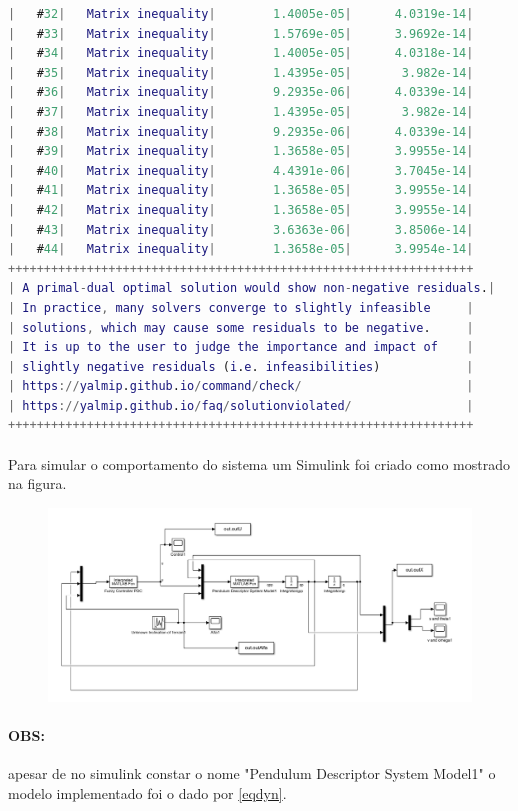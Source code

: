 \documentclass[a4paper,10pt]{article}
\begin{document}
\begin{lstlisting}[language=Matlab]
|   #32|   Matrix inequality|        1.4005e-05|      4.0319e-14|
|   #33|   Matrix inequality|        1.5769e-05|      3.9692e-14|
|   #34|   Matrix inequality|        1.4005e-05|      4.0318e-14|
|   #35|   Matrix inequality|        1.4395e-05|       3.982e-14|
|   #36|   Matrix inequality|        9.2935e-06|      4.0339e-14|
|   #37|   Matrix inequality|        1.4395e-05|       3.982e-14|
|   #38|   Matrix inequality|        9.2935e-06|      4.0339e-14|
|   #39|   Matrix inequality|        1.3658e-05|      3.9955e-14|
|   #40|   Matrix inequality|        4.4391e-06|      3.7045e-14|
|   #41|   Matrix inequality|        1.3658e-05|      3.9955e-14|
|   #42|   Matrix inequality|        1.3658e-05|      3.9955e-14|
|   #43|   Matrix inequality|        3.6363e-06|      3.8506e-14|
|   #44|   Matrix inequality|        1.3658e-05|      3.9954e-14|
+++++++++++++++++++++++++++++++++++++++++++++++++++++++++++++++++
| A primal-dual optimal solution would show non-negative residuals.|
| In practice, many solvers converge to slightly infeasible     |
| solutions, which may cause some residuals to be negative.     |
| It is up to the user to judge the importance and impact of    |
| slightly negative residuals (i.e. infeasibilities)            |
| https://yalmip.github.io/command/check/                       |
| https://yalmip.github.io/faq/solutionviolated/                |
+++++++++++++++++++++++++++++++++++++++++++++++++++++++++++++++++
\end{lstlisting}
\paragraph{}Para simular o comportamento do sistema um Simulink foi criado como mostrado na figura.

\begin{figure}[H]
	\centering
	\includegraphics[scale = 0.6]{fig/PDCsimulink}
\end{figure}
\paragraph{OBS:}apesar de no simulink constar o nome "Pendulum Descriptor System Model1" o modelo implementado foi o dado por \eqref{eqdyn}.
\end{document}
